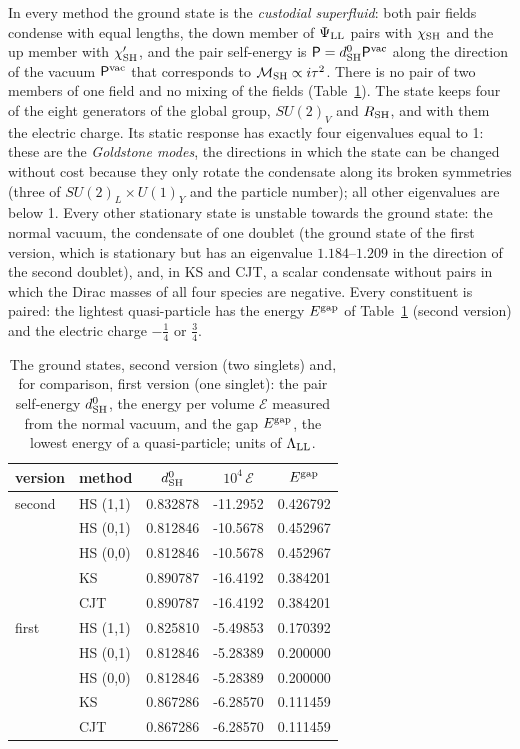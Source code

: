 \documentclass[aps,prd,twocolumn,superscriptaddress,nofootinbib,floatfix,longbibliography]{revtex4-2}
\newcommand{\LL}{{\rm LL}}
\newcommand{\SH}{{\rm SH}}
\begin{document}
In every method the ground state is the \emph{custodial superfluid}: both pair fields condense with equal lengths, the
down member of $\Psi_\LL$ pairs with $\chi_\SH$ and the up member with $\chi'_\SH$, and the pair self-energy is
$\mathsf P=d^0_\SH\mathsf P^{\rm vac}$ along the direction of the vacuum $\mathsf P^{\rm vac}$ that corresponds to
$\mathcal M_\SH\propto i\tau^2$. There is no pair of two members of one field and no mixing of the fields
(Table~\ref{tab:ground}). The state keeps four of the eight generators of the global group, $SU(2)_V$ and $R_\SH$, and
with them the electric charge. Its static response has exactly four eigenvalues equal to 1: these are the
\emph{Goldstone modes}, the directions in which the state can be changed without cost because they only rotate the
condensate along its broken symmetries (three of $SU(2)_L\times U(1)_Y$ and the particle number); all other eigenvalues
are below 1. Every other stationary state is unstable towards the ground state: the normal vacuum, the condensate of
one doublet (the ground state of the first version, which is stationary but has an eigenvalue \ensuremath{1.184}\mbox{--}\ensuremath{1.209} in
the direction of the second doublet), and, in KS and CJT, a scalar condensate without pairs in which the Dirac masses of
all four species are negative. Every constituent is paired: the lightest quasi-particle has the energy $E^{\rm gap}$ of
Table~\ref{tab:ground} (second version) and the electric charge $-\frac14$ or $\frac34$.

\begin{table}[t]
\caption{The ground states, second version (two singlets) and, for comparison, first version (one singlet): the pair
self-energy $d^0_\SH$, the energy per volume $\mathcal E$ measured from the normal vacuum, and the gap $E^{\rm gap}$, the
lowest energy of a quasi-particle; units of $\Lambda_\LL$.}
\label{tab:ground}
\begin{ruledtabular}
\begin{tabular}{llccc}
version & method & $d^0_\SH$ & $10^4\,\mathcal E$ & $E^{\rm gap}$\\
\hline
second & HS (1,1) & 0.832878 & -11.2952 & 0.426792\\
 & HS (0,1) & 0.812846 & -10.5678 & 0.452967\\
 & HS (0,0) & 0.812846 & -10.5678 & 0.452967\\
 & KS & 0.890787 & -16.4192 & 0.384201\\
 & CJT & 0.890787 & -16.4192 & 0.384201\\
first & HS (1,1) & 0.825810 & -5.49853 & 0.170392\\
 & HS (0,1) & 0.812846 & -5.28389 & 0.200000\\
 & HS (0,0) & 0.812846 & -5.28389 & 0.200000\\
 & KS & 0.867286 & -6.28570 & 0.111459\\
 & CJT & 0.867286 & -6.28570 & 0.111459\\
\end{tabular}
\end{ruledtabular}
\end{table}
\end{document}
